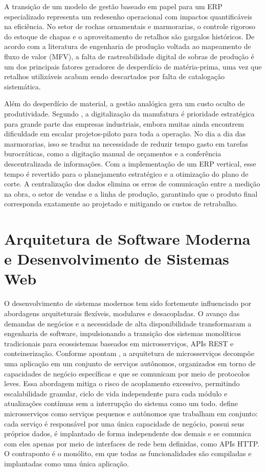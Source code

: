 A transição de um modelo de gestão baseado em papel para um ERP especializado representa um redesenho operacional com impactos quantificáveis na eficiência. No setor de rochas ornamentais e marmorarias, o controle rigoroso do estoque de chapas e o aproveitamento de retalhos são gargalos históricos. De acordo com a literatura de engenharia de produção voltada ao mapeamento de fluxo de valor (MFV), a falta de rastreabilidade digital de sobras de produção é um dos principais fatores geradores de desperdício de matéria-prima, uma vez que retalhos utilizáveis acabam sendo descartados por falta de catalogação sistemática.

Além do desperdício de material, a gestão analógica gera um custo oculto de produtividade. Segundo , a digitalização da manufatura é prioridade estratégica para grande parte das empresas industriais, embora muitas ainda encontrem dificuldade em escalar projetos-piloto para toda a operação. No dia a dia das marmorarias, isso se traduz na necessidade de reduzir tempo gasto em tarefas burocráticas, como a digitação manual de orçamentos e a conferência descentralizada de informações. Com a implementação de um ERP vertical, esse tempo é revertido para o planejamento estratégico e a otimização do plano de corte. A centralização dos dados elimina os erros de comunicação entre a medição na obra, o setor de vendas e a linha de produção, garantindo que o produto final corresponda exatamente ao projetado e mitigando os custos de retrabalho.

\section{Arquitetura de Software Moderna e Desenvolvimento de Sistemas Web}

O desenvolvimento de sistemas modernos tem sido fortemente influenciado por abordagens arquiteturais flexíveis, modulares e desacopladas. O avanço das demandas de negócios e a necessidade de alta disponibilidade transformaram a engenharia de software, impulsionando a transição dos sistemas monolíticos tradicionais para ecossistemas baseados em microsserviços, APIs REST e conteinerização. Conforme apontam , a arquitetura de microsserviços decompõe uma aplicação em um conjunto de serviços autônomos, organizados em torno de capacidades de negócio específicas e que se comunicam por meio de protocolos leves. Essa abordagem mitiga o risco de acoplamento excessivo, permitindo escalabilidade granular, ciclo de vida independente para cada módulo e atualizações contínuas sem a interrupção do sistema como um todo.  define microsserviços como serviços pequenos e autônomos que trabalham em conjunto: cada serviço é responsável por uma única capacidade de negócio, possui seus próprios dados, é implantado de forma independente dos demais e se comunica com eles apenas por meio de interfaces de rede bem definidas, como APIs HTTP. O contraponto é o monólito, em que todas as funcionalidades são compiladas e implantadas como uma única aplicação.

